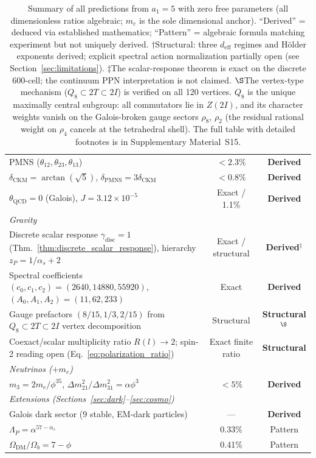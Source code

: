 \documentclass[12pt,a4paper]{article}
\theoremstyle{definition}
\begin{document}
\begin{table}[H]
\begin{tabular}{lcc}
PMNS ($\theta_{12}, \theta_{23}, \theta_{13}$) & $<2.3\%$ & \textbf{Derived} \\
$\delta_{\text{CKM}} = \arctan(\sqrt{5})$, $\delta_{\text{PMNS}} = 3\delta_{\text{CKM}}$ & $<0.8\%$ & \textbf{Derived} \\
$\theta_{\text{QCD}} = 0$ (Galois), $J = 3.12 \times 10^{-5}$ & Exact / 1.1\% & \textbf{Derived} \\
\midrule
\multicolumn{3}{l}{\textit{Gravity}} \\
Discrete scalar response $\gamma_{\mathrm{disc}} = 1$ (Thm.~\ref{thm:discrete_scalar_response}), hierarchy $z_P = 1/\alpha_s + 2$ & Exact / structural & \textbf{Derived}$^\ddagger$ \\
Spectral coefficients $(c_0,c_1,c_2) = (2640,14880,55920)$, $(A_0,A_1,A_2) = (11,62,233)$ & Exact & \textbf{Derived} \\
Gauge prefactors $(8/15,1/3,2/15)$ from $Q_8 \subset 2T \subset 2I$ vertex decomposition & Structural & \textbf{Structural}$^\S$ \\
Coexact/scalar multiplicity ratio $R(l)\to2$; spin-2 reading open (Eq.~\ref{eq:polarization_ratio}) & Exact finite ratio & \textbf{Structural} \\
\midrule
\multicolumn{3}{l}{\textit{Neutrinos ($+m_e$)}} \\
$m_3 = 2m_e/\phi^{35}$, $\Delta m^2_{21}/\Delta m^2_{31} = \alpha\phi^3$ & $<5\%$ & \textbf{Derived} \\
\midrule
\multicolumn{3}{l}{\textit{Extensions (Sections~\ref{sec:dark}--\ref{sec:cosmo})}} \\
Galois dark sector (9 stable, EM-dark particles) & --- & \textbf{Derived} \\
$\Lambda_P = \alpha^{57-\alpha_s}$ & 0.33\% & Pattern \\
$\Omega_{\text{DM}}/\Omega_b = 7 - \phi$ & 0.41\% & Pattern \\
\bottomrule
\end{tabular}
\caption[Summary of predictions.]{Summary of all predictions from $a_1 = 5$ with zero free parameters (all dimensionless ratios algebraic; $m_e$ is the sole dimensional anchor).  ``Derived'' = deduced via established mathematics; ``Pattern'' = algebraic formula matching experiment but not uniquely derived.  $\dagger$Structural: three $d_{\text{eff}}$ regimes and H\"{o}lder exponents derived; explicit spectral action normalization partially open (see Section~\ref{sec:limitations}).  $\ddagger$The scalar-response theorem is exact on the discrete 600-cell; the continuum PPN interpretation is not claimed.  $\S$The vertex-type mechanism ($Q_8 \subset 2T \subset 2I$) is verified on all 120 vertices.  $Q_8$ is the unique maximally central subgroup: all commutators lie in $Z(2I)$, and its character weights vanish on the Galois-broken gauge sectors $\rho_8$, $\rho_2$ (the residual rational weight on $\rho_4$ cancels at the tetrahedral shell).  The full table with detailed footnotes is in Supplementary Material~S15.}
\label{tab:summary}
\end{table}
\end{document}
